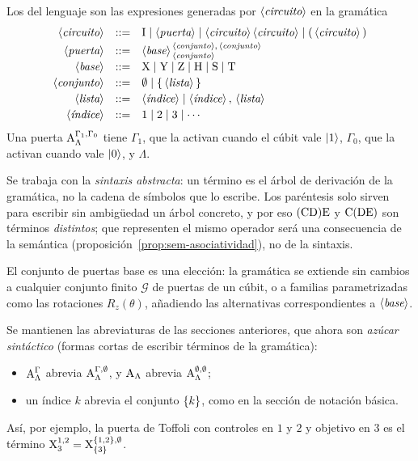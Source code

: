 \begin{definition}[Sintaxis]
  \label{def:bnf}
  Los  del lenguaje son las expresiones generadas por $\langle\textit{circuito}\rangle$ en la gramática
  \[
    \begin{array}{rcl}
      \langle\textit{circuito}\rangle & ::= & \text{I} \mid \langle\textit{puerta}\rangle \mid \langle\textit{circuito}\rangle\,\langle\textit{circuito}\rangle \mid (\,\langle\textit{circuito}\rangle\,) \\[0.5ex]
      \langle\textit{puerta}\rangle   & ::= & \langle\textit{base}\rangle^{\,\langle\textit{conjunto}\rangle,\,\langle\textit{conjunto}\rangle}_{\,\langle\textit{conjunto}\rangle}                        \\[0.5ex]
      \langle\textit{base}\rangle     & ::= & \text{X} \mid \text{Y} \mid \text{Z} \mid \text{H} \mid \text{S} \mid \text{T}        \\[0.5ex]
      \langle\textit{conjunto}\rangle & ::= & \emptyset \mid \{\,\langle\textit{lista}\rangle\,\}                                                 \\[0.5ex]
      \langle\textit{lista}\rangle    & ::= & \langle\textit{índice}\rangle \mid \langle\textit{índice}\rangle\,,\,\langle\textit{lista}\rangle                                         \\[0.5ex]
      \langle\textit{índice}\rangle   & ::= & 1 \mid 2 \mid 3 \mid \cdots
    \end{array}
  \]
  Una puerta $\text{A}^{\Gamma_1,\Gamma_0}_{\Lambda}$ tiene  $\Gamma_1$, que la activan cuando el cúbit vale $\ket{1}$,  $\Gamma_0$, que la activan cuando vale $\ket{0}$, y  $\Lambda$.
\end{definition}

Se trabaja con la \emph{sintaxis abstracta}: un término es el árbol de derivación de la gramática, no la cadena de símbolos que lo escribe. Los paréntesis solo sirven para escribir sin ambigüedad un árbol concreto, y por eso $(\text{C}\text{D})\text{E}$ y $\text{C}(\text{D}\text{E})$ son términos \emph{distintos}; que representen el mismo operador será una consecuencia de la semántica (proposición~\ref{prop:sem-asociatividad}), no de la sintaxis.

El conjunto de puertas base es una elección: la gramática se extiende sin cambios a cualquier conjunto finito $\mathcal{G}$ de puertas de un cúbit, o a familias parametrizadas como las rotaciones $R_z(\theta)$, añadiendo las alternativas correspondientes a $\langle\textit{base}\rangle$.

\begin{notation}
  \label{not:abreviaturas}
  Se mantienen las abreviaturas de las secciones anteriores, que ahora son \emph{azúcar sintáctico} (formas cortas de escribir términos de la gramática):
  \begin{itemize}
    \item $\text{A}^{\Gamma}_{\Lambda}$ abrevia $\text{A}^{\Gamma,\emptyset}_{\Lambda}$, y $\text{A}_{\Lambda}$ abrevia $\text{A}^{\emptyset,\emptyset}_{\Lambda}$;
    \item un índice $k$ abrevia el conjunto $\{k\}$, como en la sección de notación básica.
  \end{itemize}
  Así, por ejemplo, la puerta de Toffoli con controles en $1$ y $2$ y objetivo en $3$ es el término $\text{X}^{1,2}_{3}=\text{X}^{\{1,2\},\emptyset}_{\{3\}}$.
\end{notation}

